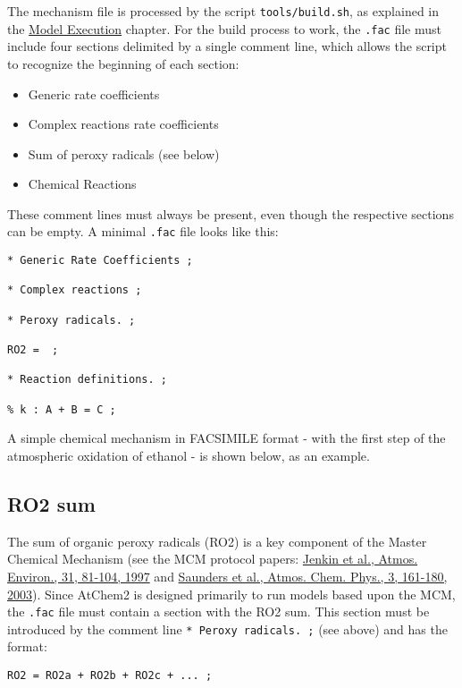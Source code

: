 The mechanism file is processed by the script \texttt{tools/build.sh},
as explained in the \hyperref[ch:execution]{Model Execution}
chapter. For the build process to work, the \texttt{.fac} file must
include four sections delimited by a single comment line, which allows
the script to recognize the beginning of each section:

\begin{itemize}
\item Generic rate coefficients
\item Complex reactions rate coefficients
\item Sum of peroxy radicals (see below)
\item Chemical Reactions
\end{itemize}

These comment lines must always be present, even though the respective
sections can be empty. A minimal \texttt{.fac} file looks like this:

\begin{verbatim}
* Generic Rate Coefficients ;

* Complex reactions ;

* Peroxy radicals. ;

RO2 =  ;

* Reaction definitions. ;

% k : A + B = C ;
\end{verbatim}

A simple chemical mechanism in FACSIMILE format - with the first step
of the atmospheric oxidation of ethanol - is shown below, as an
example.

\subsection{RO2 sum} \label{subsec:ro2-sum}

The sum of organic peroxy radicals (RO2) is a key component of the
Master Chemical Mechanism (see the MCM protocol papers:
\href{https://doi.org/10.1016/S1352-2310(96)00105-7}{Jenkin et al.,
  Atmos. Environ., 31, 81-104, 1997} and
\href{https://doi.org/10.5194/acp-3-161-2003}{Saunders et al., Atmos.
  Chem. Phys., 3, 161-180, 2003}). Since AtChem2 is designed primarily
to run models based upon the MCM, the \texttt{.fac} file must contain
a section with the RO2 sum. This section must be introduced by the
comment line \texttt{*\ Peroxy\ radicals.\ ;} (see above) and has the
format:

\begin{verbatim}
RO2 = RO2a + RO2b + RO2c + ... ;
\end{verbatim}

